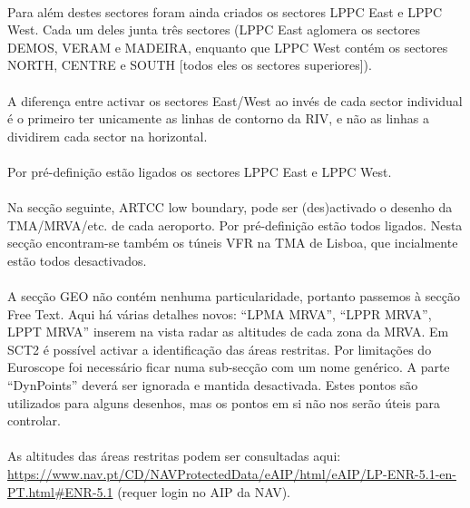 \documentclass[10pt]{report}
\begin{document}
\paragraph{} Para além destes sectores foram ainda criados os sectores LPPC East e LPPC West. Cada
um deles junta três sectores (LPPC East aglomera os sectores DEMOS, VERAM e MADEIRA, enquanto que
LPPC West contém os sectores NORTH, CENTRE e SOUTH [todos eles os sectores superiores]).

\paragraph{} A diferença entre activar os sectores East/West ao invés de cada sector individual é o
primeiro ter unicamente as linhas de contorno da RIV, e não as linhas a dividirem cada sector na
horizontal.

\paragraph{} Por pré-definição estão ligados os sectores LPPC East e LPPC West.

\paragraph{} Na secção seguinte, ARTCC low boundary, pode ser (des)activado o desenho da
TMA/MRVA/etc. de cada aeroporto. Por pré-definição estão todos ligados. Nesta secção encontram-se
também os túneis VFR na TMA de Lisboa, que incialmente estão todos desactivados.

\paragraph{} A secção GEO não contém nenhuma particularidade, portanto passemos à secção Free Text.
Aqui há várias detalhes novos: “LPMA MRVA”, “LPPR MRVA”, LPPT MRVA” inserem na vista radar as
altitudes de cada zona da MRVA. Em SCT2 é possível activar a identificação das áreas restritas. Por
limitações do Euroscope foi necessário ficar numa sub-secção com um nome genérico. A parte
“DynPoints” deverá ser ignorada e mantida desactivada. Estes pontos são utilizados para alguns
desenhos, mas os pontos em si não nos serão úteis para controlar.

\paragraph{} As altitudes das áreas restritas podem ser consultadas aqui:
\url{https://www.nav.pt/CD/NAVProtectedData/eAIP/html/eAIP/LP-ENR-5.1-en-PT.html#ENR-5.1} (requer login
no AIP da NAV).
\end{document}
